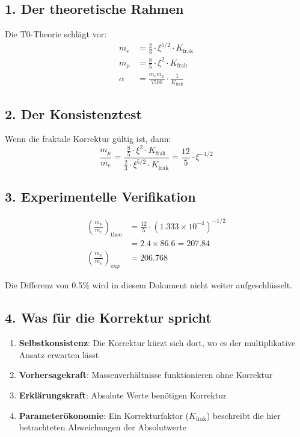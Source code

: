 \subsection{1. Der theoretische Rahmen}

Die T0-Theorie schlägt vor:
\begin{align*}
	m_e &= \frac{2}{3} \cdot \xi^{5/2} \cdot K_{\text{frak}} \\
	m_\mu &= \frac{8}{5} \cdot \xi^2 \cdot K_{\text{frak}} \\
	\alpha &= \frac{m_e m_\mu}{7500} \cdot \frac{1}{K_{\text{frak}}}
\end{align*}

\subsection{2. Der Konsistenztest}

Wenn die fraktale Korrektur gültig ist, dann:
\[
\frac{m_\mu}{m_e} = \frac{\frac{8}{5} \cdot \xi^2 \cdot K_{\text{frak}}}{\frac{2}{3} \cdot \xi^{5/2} \cdot K_{\text{frak}}} = \frac{12}{5} \cdot \xi^{-1/2}
\]

\subsection{3. Experimentelle Verifikation}

\begin{align*}
	\left(\frac{m_\mu}{m_e}\right)_{\text{theo}} &= \frac{12}{5} \cdot (1.333 \times 10^{-4})^{-1/2} \\
	&= 2.4 \times 86.6 = 207.84 \\
	\left(\frac{m_\mu}{m_e}\right)_{\text{exp}} &= 206.768
\end{align*}

Die Differenz von 0.5\% wird in diesem Dokument nicht weiter aufgeschlüsselt.

\subsection{4. Was für die Korrektur spricht}

\begin{enumerate}
	\item \textbf{Selbstkonsistenz}: Die Korrektur kürzt sich dort, wo es der multiplikative Ansatz erwarten lässt
	\item \textbf{Vorhersagekraft}: Massenverhältnisse funktionieren ohne Korrektur
	\item \textbf{Erklärungskraft}: Absolute Werte benötigen Korrektur
	\item \textbf{Parameterökonomie}: Ein Korrekturfaktor ($K_{\text{frak}}$) beschreibt die hier betrachteten Abweichungen der Absolutwerte
\end{enumerate}

